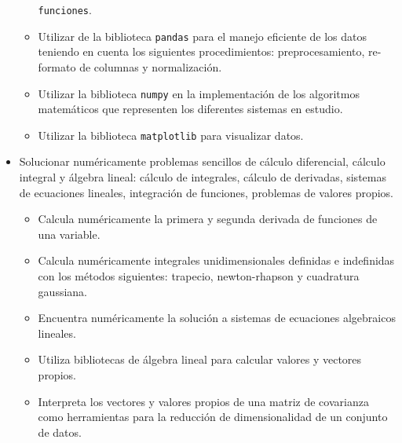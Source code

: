 \documentclass[letterpaper,10pt,onecolumn]{article}
\begin{document}
\begin{itemize}
\begin{itemize}
     \texttt{funciones}.\\[-0.5cm] 
    \item Utilizar de la biblioteca \texttt{pandas} para el manejo eficiente de los datos
    teniendo en cuenta los siguientes procedimientos: preprocesamiento, re-formato de
    columnas y normalizaci\'on.\\[-0.5cm] 
   \item Utilizar la biblioteca \texttt{numpy} en la implementaci\'on
     de los algoritmos matem\'aticos que representen los diferentes
     sistemas en estudio.\\[-0.5cm] 
    \item  Utilizar la biblioteca \texttt{matplotlib} para visualizar
      datos.\\[-0.5cm] 
\end{itemize}

\item Solucionar numéricamente problemas sencillos de cálculo
  diferencial, cálculo integral y álgebra lineal: cálculo de
  integrales, cálculo de derivadas, sistemas de ecuaciones lineales,
  integraci\'on de funciones, problemas de valores propios. \\[-0.6cm]   

\begin{itemize}
    \item Calcula num\'ericamente la primera y segunda derivada de
      funciones de una variable. 
    \item Calcula num\'ericamente integrales unidimensionales
      definidas e indefinidas con los m\'etodos siguientes: trapecio,
      newton-rhapson y cuadratura gaussiana. 
    \item Encuentra num\'ericamente la soluci\'on a sistemas de
      ecuaciones algebraicos lineales. 
    \item Utiliza bibliotecas de \'algebra lineal para calcular
      valores y vectores propios. 
    \item Interpreta los vectores y valores propios de una matriz de
      covarianza como herramientas para la reducci\'on de
      dimensionalidad de un conjunto de datos. 
\end{itemize}
\end{itemize}

\vspace*{0.5cm} 
\end{document}
